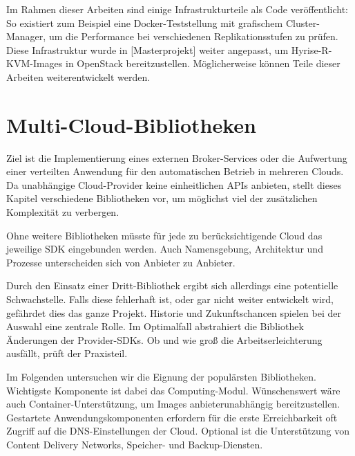 Im Rahmen dieser Arbeiten sind einige Infrastrukturteile als Code veröffentlicht: So existiert zum Beispiel eine Docker-Teststellung mit grafischem Cluster-Manager, um die Performance bei verschiedenen Replikationsstufen zu prüfen. Diese Infrastruktur wurde in [Masterprojekt] weiter angepasst, um Hyrise-R-KVM-Images in OpenStack bereitzustellen. Möglicherweise können Teile dieser Arbeiten weiterentwickelt werden.


\section{Multi-Cloud-Bibliotheken}

Ziel ist die Implementierung eines externen Broker-Services oder die Aufwertung einer verteilten Anwendung für den automatischen Betrieb in mehreren Clouds. Da unabhängige Cloud-Provider keine einheitlichen APIs anbieten, stellt dieses Kapitel verschiedene Bibliotheken vor, um möglichst viel der zusätzlichen Komplexität zu verbergen.

Ohne weitere Bibliotheken müsste für jede zu berücksichtigende Cloud das jeweilige SDK eingebunden werden. Auch Namensgebung, Architektur und Prozesse unterscheiden sich von Anbieter zu Anbieter. 

Durch den Einsatz einer Dritt-Bibliothek ergibt sich allerdings eine potentielle Schwachstelle. Falls diese fehlerhaft ist, oder gar nicht weiter entwickelt wird, gefährdet dies das ganze Projekt. Historie und Zukunftschancen spielen bei der Auswahl eine zentrale Rolle. Im Optimalfall abstrahiert die Bibliothek Änderungen der Provider-SDKs. Ob und wie groß die Arbeitserleichterung ausfällt, prüft der Praxisteil.

Im Folgenden untersuchen wir die Eignung der populärsten Bibliotheken. Wichtigste Komponente ist dabei das Computing-Modul. Wünschenswert wäre auch Container-Unterstützung, um Images anbieterunabhängig bereitzustellen. Gestartete Anwendungskomponenten erfordern für die erste Erreichbarkeit oft Zugriff auf die DNS-Einstellungen der Cloud. Optional ist die Unterstützung von Content Delivery Networks, Speicher- und Backup-Diensten.

